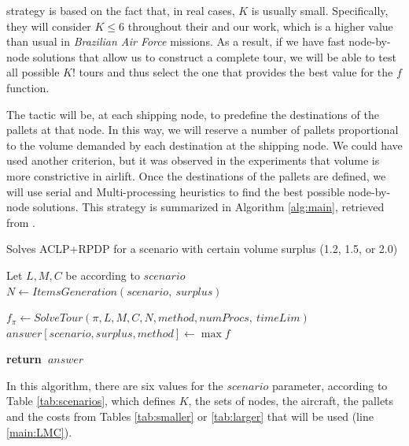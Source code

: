\documentclass[preprint,authoryear]{elsarticle}
\renewcommand{\Return}{\State \bf {return}~}
\begin{document}
\cite{MesquitaSanches2023} strategy is based on the fact that, in real cases, $K$\/ is usually small. Specifically, they will consider $K \leq 6$\/ throughout their and our work, which is a higher value than usual in {\it Brazilian Air Force} missions. As a result, if we have fast node-by-node solutions that allow us to construct a complete tour, we will be able to test all possible $K!$\/ tours and thus select the one that provides the best value for the $f$\/ function.

The tactic will be, at each shipping node, to predefine the destinations of the pallets at that node. In this way, we will reserve a number of pallets proportional to the volume demanded by each destination at the shipping node. We could have used another criterion, but it was observed in the experiments that volume is more constrictive in airlift. Once the destinations of the pallets are defined, we will use serial and Multi-processing heuristics to find the best possible node-by-node solutions. This strategy is summarized in Algorithm \ref{alg:main}, retrieved from \cite{MesquitaSanches2023}.


\begin{algorithm}[H]
	\caption{Solves ACLP+RPDP for a scenario with certain volume surplus (1.2, 1.5, or 2.0)}  \label{alg:main}
	\begin{algorithmic}[1]
		
		
		\State Let $L, M, C$ be according to $scenario$ \label{main:LMC}
		\State $N \gets ItemsGeneration(scenario,\ surplus)$ \label{main:items}
				
			 \label{main:loop1}
				\State $f_{\pi} \gets SolveTour(\pi, L, M, C, N, method, numProcs,\ timeLim )$ \label{main:method}
			\EndFor \label{main:loop2}
			\State $answer[scenario,surplus,method] \gets \max f$ \label{main:f}
		\EndFor
		
		\Return $answer$
		
		\EndProcedure
	\end{algorithmic}
\end{algorithm}


In this algorithm, there are six values for the $scenario$\/ parameter, according to Table \ref{tab:scenarios}, which defines $K$, the sets of nodes, the aircraft, the pallets and the costs from Tables \ref{tab:smaller} or \ref{tab:larger} that will be used (line \ref{main:LMC}).
\end{document}
